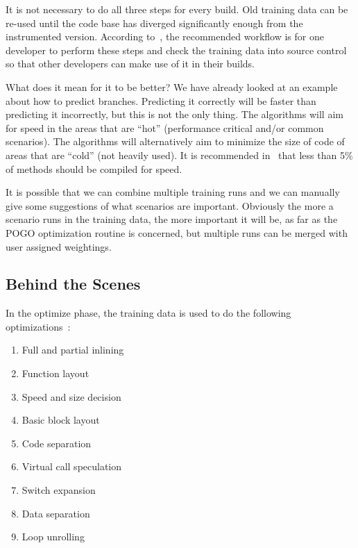 \documentclass[a4paper]{report}
\begin{document}
It is not necessary to do all three steps for every build. Old training data can be re-used until the code base has diverged significantly enough from the instrumented version. According to~\cite{pogo}, the recommended workflow is for one developer to perform these steps and check the training data into source control so that other developers can make use of it in their builds.

What does it mean for it to be better? We have already looked at an example about how to predict branches. Predicting it correctly will be faster than predicting it incorrectly, but this is not the only thing.  The algorithms will aim for speed in the areas that are ``hot'' (performance critical and/or common scenarios). The algorithms will alternatively aim to minimize the size of code of areas that are ``cold'' (not heavily used). It is recommended in~\cite{pogo} that less than 5\% of methods should be compiled for speed.

It is possible that we can combine multiple training runs and we can manually give some suggestions of what scenarios are important. Obviously the more a scenario runs in the training data, the more important it will be, as far as the POGO optimization routine is concerned, but multiple runs can be merged with user assigned weightings.

\subsection*{Behind the Scenes}

In the optimize phase, the training data is used to do the following optimizations~\cite{pogo2}:

\begin{multicols}{2}
\begin{enumerate}
\item Full and partial inlining
\item Function layout
\item Speed and size decision
\item Basic block layout 
\item Code separation
\item Virtual call speculation
\item Switch expansion
\item Data separation
\item Loop unrolling
\end{enumerate}
\end{multicols}
\end{document}
